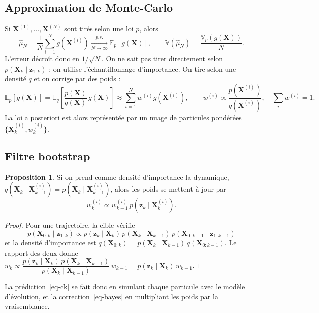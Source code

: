 \documentclass[11pt]{article}
\theoremstyle{definition}
\newtheorem{proposition}{Proposition}
\theoremstyle{remark}
\newcommand{\E}{\mathbb{E}}
\newcommand{\X}{\mathbf{X}}
\newcommand{\z}{\mathbf{z}}
\begin{document}
\subsection{Approximation de Monte-Carlo}
Si $\X^{(1)}, \dots, \X^{(N)}$ sont tirés selon une loi $p$, alors
\begin{equation}
  \hat\mu_N = \frac1N \sum_{i=1}^N g(\X^{(i)}) \xrightarrow[N\to\infty]{p.s.} \E_p[g(\X)],
  \qquad
  \mathbb{V}(\hat\mu_N) = \frac{\mathbb{V}_p(g(\X))}{N}.
\end{equation}
L'erreur décroît donc en $1/\sqrt N$. On ne sait pas tirer directement selon
$p(\X_k \mid \z_{1:k})$ : on utilise l'échantillonnage d'importance. On tire
selon une densité $q$ et on corrige par des poids :
\begin{equation}
  \E_p[g(\X)] = \E_q\!\left[\frac{p(\X)}{q(\X)}\, g(\X)\right]
  \approx \sum_{i=1}^N w^{(i)} g(\X^{(i)}),
  \qquad w^{(i)} \propto \frac{p(\X^{(i)})}{q(\X^{(i)})},\quad \sum_i w^{(i)} = 1.
\end{equation}
La loi a posteriori est alors représentée par un nuage de particules pondérées
$\{\X_k^{(i)}, w_k^{(i)}\}$.

\subsection{Filtre bootstrap}
\begin{proposition}
Si on prend comme densité d'importance la dynamique,
$q(\X_k \mid \X_{k-1}^{(i)}) = p(\X_k \mid \X_{k-1}^{(i)})$, alors les poids se
mettent à jour par
\begin{equation}
  w_k^{(i)} \propto w_{k-1}^{(i)}\, p(\z_k \mid \X_k^{(i)}).
  \label{eq-poids}
\end{equation}
\end{proposition}
\begin{proof}
Pour une trajectoire, la cible vérifie
\[
p(\X_{0:k} \mid \z_{1:k}) \propto p(\z_k \mid \X_k)\, p(\X_k \mid \X_{k-1})\, p(\X_{0:k-1} \mid \z_{1:k-1})
\]
et la densité d'importance est $q(\X_{0:k}) = p(\X_k \mid \X_{k-1})\, q(\X_{0:k-1})$.
Le rapport des deux donne
$w_k \propto \dfrac{p(\z_k \mid \X_k)\, p(\X_k \mid \X_{k-1})}{p(\X_k \mid \X_{k-1})}\, w_{k-1}
= p(\z_k \mid \X_k)\, w_{k-1}$.
\end{proof}
La prédiction~\eqref{eq-ck} se fait donc en simulant chaque particule avec
le modèle d'évolution, et la correction~\eqref{eq-bayes} en multipliant les
poids par la vraisemblance.
\end{document}
